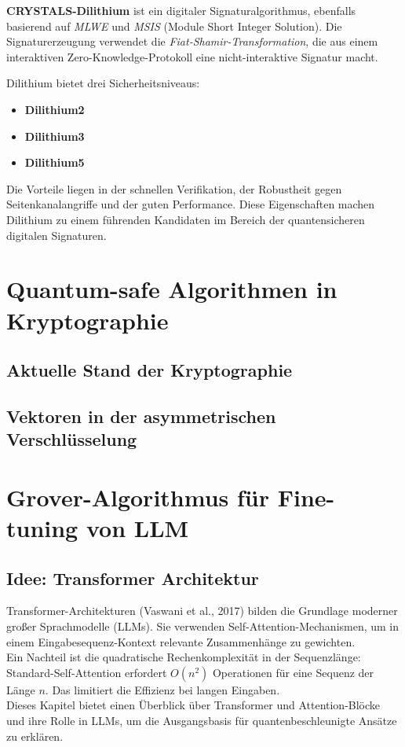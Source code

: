 \textbf{CRYSTALS-Dilithium} ist ein digitaler Signaturalgorithmus, ebenfalls basierend auf \textit{MLWE} und \textit{MSIS} (Module Short Integer Solution). Die Signaturerzeugung verwendet die \textit{Fiat-Shamir-Transformation}, die aus einem interaktiven Zero-Knowledge-Protokoll eine nicht-interaktive Signatur macht.

Dilithium bietet drei Sicherheitsniveaus:

\begin{itemize}
  \item \textbf{Dilithium2}
  \item \textbf{Dilithium3}
  \item \textbf{Dilithium5}
\end{itemize}

Die Vorteile liegen in der schnellen Verifikation, der Robustheit gegen Seitenkanalangriffe und der guten Performance. Diese Eigenschaften machen Dilithium zu einem führenden Kandidaten im Bereich der quantensicheren digitalen Signaturen.



\section{Quantum-safe Algorithmen in Kryptographie}
\subsection{Aktuelle Stand der Kryptographie}
\subsection{Vektoren in der asymmetrischen Verschlüsselung}

\section{Grover-Algorithmus für Fine-tuning von LLM}
\subsection{Idee: Transformer Architektur}
Transformer-Architekturen (Vaswani et al., 2017) bilden die Grundlage moderner großer Sprachmodelle (LLMs). Sie verwenden Self-Attention-Mechanismen, um in einem Eingabesequenz-Kontext relevante Zusammenhänge zu gewichten.\\
Ein Nachteil ist die quadratische Rechenkomplexität in der Sequenzlänge: Standard-Self-Attention erfordert $O(n^2)$ Operationen für eine Sequenz der Länge $n$. Das limitiert die Effizienz bei langen Eingaben.\\
Dieses Kapitel bietet einen Überblick über Transformer und Attention-Blöcke und ihre Rolle in LLMs, um die Ausgangsbasis für quantenbeschleunigte Ansätze zu erklären.

